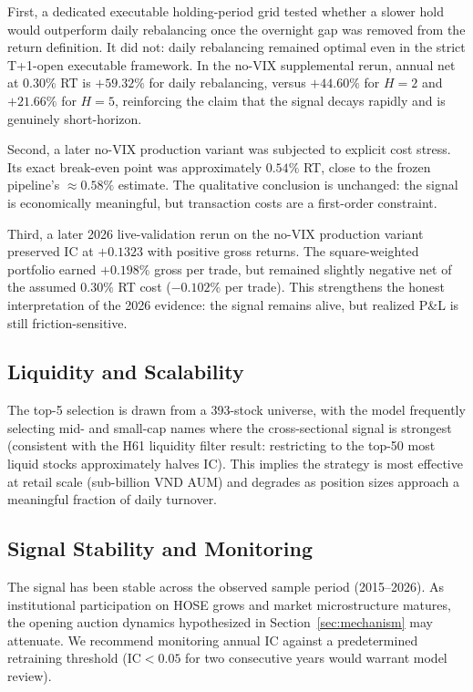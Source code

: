 \documentclass[12pt,a4paper]{article}
\begin{document}


First, a dedicated executable holding-period grid tested whether a slower hold
would outperform daily rebalancing once the overnight gap was removed from the
return definition. It did not: daily rebalancing remained optimal even in the
strict T+1-open executable framework. In the no-VIX supplemental rerun, annual
net at $0.30\%$ RT is $+59.32\%$ for daily rebalancing, versus $+44.60\%$ for
$H=2$ and $+21.66\%$ for $H=5$, reinforcing the claim that the signal decays
rapidly and is genuinely short-horizon.

Second, a later no-VIX production variant was subjected to explicit cost stress.
Its exact break-even point was approximately $0.54\%$ RT, close to the frozen
pipeline's $\approx 0.58\%$ estimate. The qualitative conclusion is unchanged:
the signal is economically meaningful, but transaction costs are a first-order
constraint.

Third, a later 2026 live-validation rerun on the no-VIX production variant
preserved IC at $+0.1323$ with positive gross returns. The square-weighted
portfolio earned $+0.198\%$ gross per trade, but remained slightly negative
net of the assumed $0.30\%$ RT cost ($-0.102\%$ per trade). This strengthens
the honest interpretation of the 2026 evidence: the signal remains alive, but
realized P\&L is still friction-sensitive.

\subsection{Liquidity and Scalability}
The top-5 selection is drawn from a 393-stock universe, with the model frequently
selecting mid- and small-cap names where the cross-sectional signal is strongest
(consistent with the H61 liquidity filter result: restricting to the top-50 most
liquid stocks approximately halves IC). This implies the strategy is most effective
at retail scale (sub-billion VND AUM) and degrades as position sizes approach a
meaningful fraction of daily turnover.

\subsection{Signal Stability and Monitoring}
\label{sec:stability}
The signal has been stable across the observed sample period (2015--2026). As
institutional participation on HOSE grows and market microstructure matures,
the opening auction dynamics hypothesized in Section~\ref{sec:mechanism} may
attenuate. We recommend monitoring annual IC against a predetermined retraining
threshold ($\text{IC} < 0.05$ for two consecutive years would warrant model review).
\end{document}
